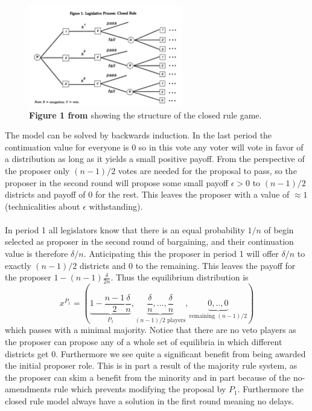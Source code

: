 \begin{figure}
    \includegraphics[width=0.6\textwidth]{figures/bf.png}
    \caption{\textbf{Figure 1 from \cite{baron_bargaining_1989}} showing the structure of the closed rule game.}
\end{figure}
The model can be solved by backwards induction. In the last period the continuation value for everyone is $0$ so in this vote any voter will vote in favor of a distribution as long as it yields a small positive payoff. From the perspective of the proposer only $(n-1)/2$ votes are needed for the proposal to pass, so the proposer in the second round will propose some small payoff $\epsilon>0$ to $(n-1)/2$ districts and payoff of $0$ for the rest. This leaves the proposer with a value of $\approx 1$ (technicalities about $\epsilon$ withstanding).
\\ \\
In period 1 all legislators know that there is an equal probability $1/n$ of begin selected as proposer in the second round of bargaining, and their continuation value is therefore $\delta/n$. Anticipating this the proposer in period 1 will offer $\delta / n$ to exactly $(n-1)/2$ districts and 0 to the remaining. This leaves the payoff for the proposer $1 - (n-1) \frac{\delta}{2n}$. Thus the equilibrium distribution is 
\begin{equation}
    x^{P_1} = (\underbrace{1-\frac{n-1}{2} \frac{\delta}{n}}_{P_1}, \underbrace{\frac{\delta}{n}, ...,\frac{\delta}{n}}_{(n-1)/2 \text{ players}}, \underbrace{0,..,0}_{\text{remaining } (n-1)/2})
\end{equation}
which passes with a minimal majority. Notice that there are no veto players as the proposer can propose any of a whole set of equilibria in which different districts get 0. Furthermore we see quite a significant benefit from being awarded the initial proposer role. This is in part a result of the majority rule system, as the proposer can skim a benefit from the minority and in part because of the no-amendments rule which prevents modifying the proposal by $P_1$. Furthermore the closed rule model always have a solution in the first round meaning no delays.

